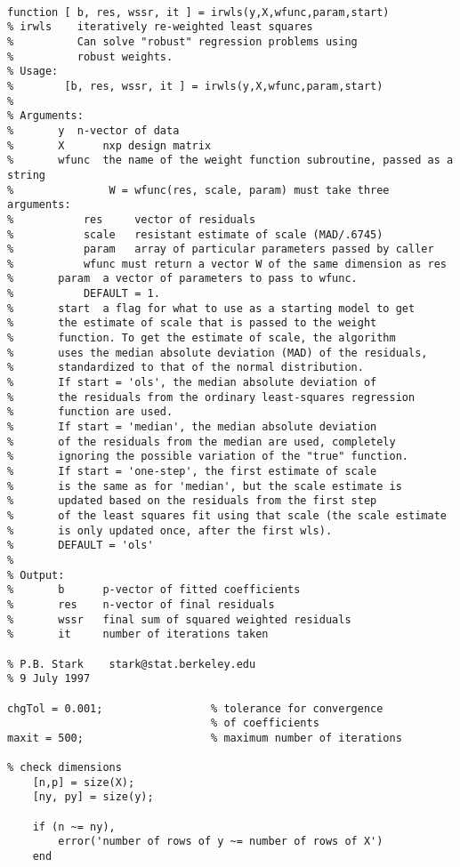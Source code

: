 \begin{verbatim}

function [ b, res, wssr, it ] = irwls(y,X,wfunc,param,start)
% irwls    iteratively re-weighted least squares
%          Can solve "robust" regression problems using
%          robust weights.
% Usage:
%        [b, res, wssr, it ] = irwls(y,X,wfunc,param,start)
%
% Arguments:
%       y  n-vector of data
%       X      nxp design matrix
%       wfunc  the name of the weight function subroutine, passed as a string
%               W = wfunc(res, scale, param) must take three arguments:
%           res     vector of residuals
%           scale   resistant estimate of scale (MAD/.6745)
%           param   array of particular parameters passed by caller
%           wfunc must return a vector W of the same dimension as res
%       param  a vector of parameters to pass to wfunc.
%           DEFAULT = 1.
%       start  a flag for what to use as a starting model to get
%       the estimate of scale that is passed to the weight
%       function. To get the estimate of scale, the algorithm
%       uses the median absolute deviation (MAD) of the residuals,
%       standardized to that of the normal distribution.
%       If start = 'ols', the median absolute deviation of
%       the residuals from the ordinary least-squares regression
%       function are used.
%       If start = 'median', the median absolute deviation
%       of the residuals from the median are used, completely
%       ignoring the possible variation of the "true" function.
%       If start = 'one-step', the first estimate of scale
%       is the same as for 'median', but the scale estimate is
%       updated based on the residuals from the first step
%       of the least squares fit using that scale (the scale estimate
%       is only updated once, after the first wls).
%       DEFAULT = 'ols'
%
% Output:
%       b      p-vector of fitted coefficients
%       res    n-vector of final residuals
%       wssr   final sum of squared weighted residuals
%       it     number of iterations taken

% P.B. Stark    stark@stat.berkeley.edu
% 9 July 1997

chgTol = 0.001;                 % tolerance for convergence
                                % of coefficients
maxit = 500;                    % maximum number of iterations

% check dimensions
    [n,p] = size(X);
    [ny, py] = size(y);

    if (n ~= ny),
        error('number of rows of y ~= number of rows of X')
    end


\end{verbatim}
